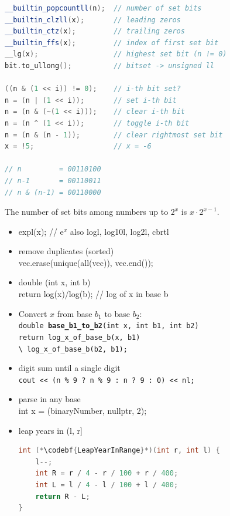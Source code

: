 \begin{lstlisting}[language=C++]
__builtin_popcountll(n);  // number of set bits
__builtin_clzll(x);       // leading zeros
__builtin_ctz(x);         // trailing zeros
__builtin_ffs(x);         // index of first set bit
__lg(x);                  // highest set bit (n != 0)
bit.to_ullong();          // bitset -> unsigned ll

((n & (1 << i)) != 0);    // i-th bit set?
n = (n | (1 << i));       // set i-th bit
n = (n & (~(1 << i)));    // clear i-th bit
n = (n ^ (1 << i));       // toggle i-th bit
n = (n & (n - 1));        // clear rightmost set bit
x = !5;                   // x = -6

// n         = 00110100
// n-1       = 00110011
// n & (n-1) = 00110000
\end{lstlisting}
The number of set bits among numbers up to $2^x$ is $x \cdot 2^{x-1}$.

\begin{itemize}
\item expl(x); // e$^x$ also logl, log10l, log2l, cbrtl
\item remove duplicates (sorted)
\\ vec.erase(unique(all(vec)), vec.end());   
\item double (int x, int b)
\\ \qquad return log(x)/log(b);	// log of x in base b
\item Convert $x$ from base $b_1$ to base $b_2$: 
\\ \texttt{double \textbf{base\_b1\_to\_b2}(int x, int b1, int b2)} 
\\ \quad \texttt{return log\_x\_of\_base\_b(x, b1) 
\\ \qquad \textbackslash\ log\_x\_of\_base\_b(b2, b1);}
\item digit sum until a single digit
\\ \texttt{cout << (n \% 9 ? n \% 9 : n ? 9 : 0) << nl;}
\item parse in any base
\\ int x = (binaryNumber, nullptr, 2); 
\item leap years in (l, r]	\\
\begin{lstlisting}[language=C++]
int (*\codebf{LeapYearInRange}*)(int r, int l) {        
    l--;
    int R = r / 4 - r / 100 + r / 400;
    int L = l / 4 - l / 100 + l / 400;
    return R - L;
}
\end{lstlisting}
\end{itemize}

